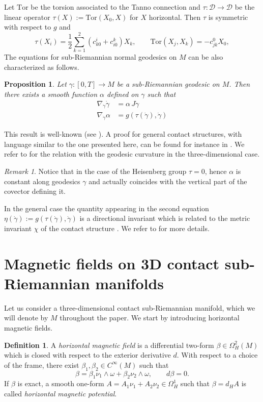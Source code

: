 \documentclass{amsart}
\theoremstyle{plain}
\newtheorem{proposition}[theorem]{Proposition}
\theoremstyle{definition}
\newtheorem{definition}[thm]{Definition}
\theoremstyle{remark}
\newtheorem{remark}[thm]{Remark}
\newcommand{\Tor}{\mathrm{Tor}}
\newcommand{\diff}{d}%
\newcommand{\sr}{sub-{R}ie\-man\-nian }
\newcommand{\distr}{\mathcal{D}}								%
\newcommand{\B}{\beta}
\begin{document}
Let $\Tor$ be the torsion associated to the Tanno connection and  $\tau:\distr \to \distr$ be the linear operator $\tau(X):=\Tor(X_0,X)$ for $X$ horizontal. Then $\tau$ is symmetric with respect to $g$ and
\begin{equation}
\tau(X_i) = \frac{1}{2}\sum_{k=1}^{2}(c_{k0}^i + c_{i0}^k) X_k, \qquad \Tor(X_j,X_k) = - c_{jk}^0 X_0, \end{equation}
The equations for sub-Riemannian normal geodesics on $M$ can be also characterized as follows. 
\begin{proposition}\label{p:77}
Let $\gamma:[0,T]\to M$ be a sub-Riemannian geodesic on $M$. Then there exists a smooth function $\alpha$ defined on $\gamma$ such that
\begin{align}
\nabla_{\dot\gamma}\dot \gamma &= \alpha \,J\dot \gamma\\
\nabla_{\dot \gamma} \alpha &= g(\tau(\dot \gamma),\dot \gamma)
\end{align}
\end{proposition}
This result is well-known (see \cite[Proposition 15]{RuminContact}). A proof for general contact structures, with language similar to the one presented here, can be found for instance in \cite{abrcontact}. We refer to \cite{BKACV} for the relation with the geodesic curvature in the three-dimensional case. 
\begin{remark}
Notice that in the case of the Heisenberg group $\tau=0$, hence $\alpha$ is constant along geodesics $\gamma$ and actually coincides with the vertical part of the covector defining it.

In the general case the quantity appearing in the second equation $\eta(\dot \gamma):= g(\tau(\dot \gamma),\dot \gamma)$ is a directional invariant which is related to the metric invariant $\chi$ of the contact structure \cite{AB12}. We refer to \cite{BKACV} for more details.
\end{remark}




\newcommand{\bi}{\zeta}
\section{Magnetic fields on 3{D} contact sub-{R}iemannian manifolds}
\label{s:mfield}

Let us consider a three-dimensional contact \sr manifold, which we will denote by $M$ throughout the paper. We start by introducing horizontal magnetic fields.


\begin{definition}
A \emph{horizontal magnetic field} is a differential two-form $\B\in\Omega^2_H(M)$ which is closed with respect to the exterior derivative $\diff$. 
With respect to a choice of the frame, there exist $\beta_1,\beta_2\in C^\infty(M)$ such that
\begin{equation}
	\B=\B_{1}\nu_1\wedge\omega + \B_{2}\nu_2\wedge\omega, \qquad \diff \B=0.
\end{equation}
If $\B$ is exact, a  smooth one-form $A=A_1\nu_1+A_2\nu_2\in \Omega_H^1$ such that $\B=\diff_HA$ is called \emph{horizontal magnetic potential}.
\end{definition}
\end{document}
